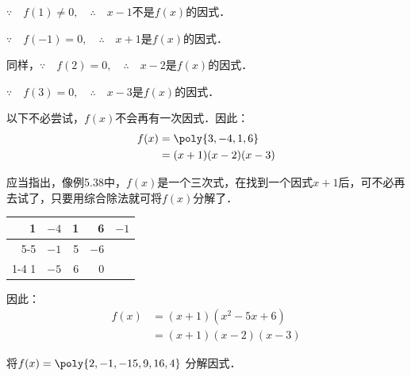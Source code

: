 \begin{solution}
$\because\quad f(1)\ne 0,\quad \therefore\quad x-1$不是$f(x)$的因式．

$\because\quad f(-1)= 0,\quad \therefore\quad x+1$是$f(x)$的因式．

同样，$\because\quad f(2)= 0,\quad \therefore\quad x-2$是$f(x)$的因式．

$\because\quad f(3)= 0,\quad \therefore\quad x-3$是$f(x)$的因式．

以下不必尝试，$f(x)$不会再有一次因式．因此：
\[\begin{split}
 f(x)&=\poly{3,-4,1,6}\\
 &=(x+1)(x-2)(x-3)   
\end{split}\]
\end{solution}

应当指出，像例5.38中，$f(x)$是一个三次式，在找到一个因式$x+1$后，可不必再去试了，只要用综合除法就可将$f(x)$分解了．
\begin{center}
\begin{tabular}{rrrr|r}
    1 &$-4$&1&6  &$-1$\\
    \cline{5-5}
    & $-1$ & 5& $-6$\\
    \cline{1-4}
    1&$-5$ & 6&0\\
\end{tabular}    
\end{center}
因此：
\[\begin{split}
    f(x)&=(x+1)(x^2-5x+6)\\
    &=(x+1)(x-2)(x-3)
\end{split}\]

\begin{example}
    将$f(x)=\poly{2,-1,-15,9,16,4}$ 分解因式．
\end{example}


